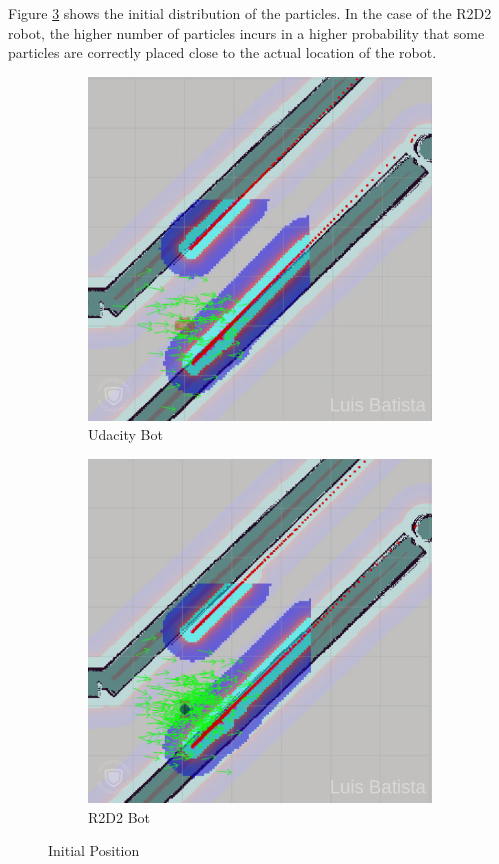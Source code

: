 \documentclass[10pt,journal,compsoc]{IEEEtran}
\begin{document}
Figure \ref{fig:initial-position} shows the initial distribution of the particles. In the case of the R2D2 robot, the higher number of particles incurs in a higher probability that some particles are correctly placed close to the actual location of the robot.


\begin{figure}[H]
\centering
\begin{subfigure}{.5\linewidth}
  \centering
  \includegraphics[width=.95\linewidth]{ub_1.png}
  \caption{Udacity Bot}
  \label{fig:ub-1}
\end{subfigure}%
\begin{subfigure}{.5\linewidth}
  \centering
  \includegraphics[width=.95\linewidth]{r2d2_1.png}
  \caption{R2D2 Bot}
  \label{fig:r2d2-1}
\end{subfigure}
\caption{Initial Position}
\label{fig:initial-position}
\end{figure}
\end{document}
